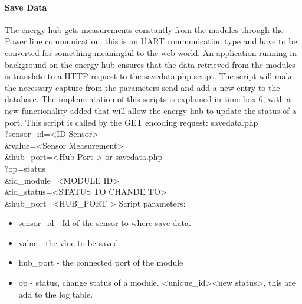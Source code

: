 \paragraph{Save Data}
The energy hub gets measurements constantly from the modules through the Power line communication, this is an UART communication type and have to be converted for something meaningful to the web world. An application running in background on the energy hub ensures that the data retrieved from the modules is translate to a HTTP request to the savedata.php script. The script will make the necessary capture from the parameters send and add a new entry to the database. The implementation of this scripts is explained in time box 6, with a new functionality added that will allow the energy hub to update the status of a port.
\p
This script is called by the GET encoding request:
\p
savedata.php \\
?sensor\_id=\textless ID Sensor\textgreater \\
\&value=\textless Sensor Measurement\textgreater \\
\&hub\_port=\textless Hub Port \textgreater
\p
or 
\p
savedata.php\\
?op=status \\
\&id\_module=\textless MODULE ID\textgreater \\
\&id\_status=\textless STATUS TO CHANDE TO\textgreater \\
\&hub\_port=\textless HUB\_PORT \textgreater
\p
Script parameters:
\begin{itemize}
	\item sensor\_id - Id of the sensor to where save data.
	\item value - the vlue to be saved
	\item hub\_port - the connected port of the module
	\item op - status, change status of a module. <unique\_id><new status>, this are add to the log table.
\end{itemize}
